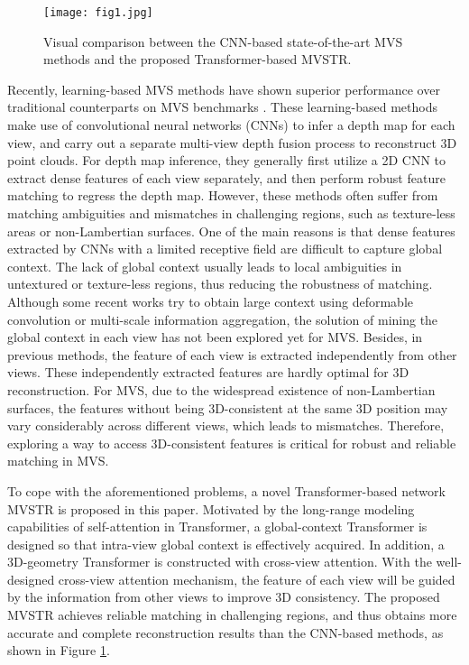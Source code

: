 \documentclass[10pt,twocolumn,letterpaper]{article}
\begin{document}
\begin{figure}[!t]
	\centering
	\texttt{[image: fig1.jpg]}
	\caption{Visual comparison between the CNN-based state-of-the-art MVS methods \cite{rmvsnet,ucsnet,patchmatchnet} and the proposed Transformer-based MVSTR.}
	\label{fig.1}
	\vspace{-0.5cm}
\end{figure}

Recently, learning-based MVS methods \cite{mvsnet,rmvsnet,pmvsnet,mvscrf,pointmvsnet,cider,fastmvsnet,casmvsnet,cvpmvsnet,ucsnet,pvamvsnet,patchmatchnet,aarmvsnet,eppmvsnet} have shown superior performance over traditional counterparts on MVS benchmarks \cite{dtu,t&t}. These learning-based methods make use of convolutional neural networks (CNNs) to infer a depth map for each view, and carry out a separate multi-view depth fusion process to reconstruct 3D point clouds. For depth map inference, they generally first utilize a 2D CNN to extract dense features of each view separately, and then perform robust feature matching to regress the depth map. However, these methods often suffer from matching ambiguities and mismatches in challenging regions, such as texture-less areas or non-Lambertian surfaces. One of the main reasons is that dense features extracted by CNNs with a limited receptive field are difficult to capture global context. The lack of global context usually leads to local ambiguities in untextured or texture-less regions, thus reducing the robustness of matching. Although some recent works \cite{aarmvsnet,mvscrf} try to obtain large context using deformable convolution or multi-scale information aggregation, the solution of mining the global context in each view has not been explored yet for MVS. Besides, in previous methods, the feature of each view is extracted independently from other views. These independently extracted features are hardly optimal for 3D reconstruction. For MVS, due to the widespread existence of non-Lambertian surfaces, the features without being 3D-consistent at the same 3D position may vary considerably across different views, which leads to mismatches. Therefore, exploring a way to access 3D-consistent features is critical for robust and reliable matching in MVS.
 
To cope with the aforementioned problems, a novel Transformer-based network MVSTR is proposed in this paper. Motivated by the long-range modeling capabilities of self-attention in Transformer, a global-context Transformer is designed so that intra-view global context is effectively acquired. In addition, a 3D-geometry Transformer is constructed with cross-view attention. With the well-designed cross-view attention mechanism, the feature of each view will be guided by the information from other views to improve 3D consistency. The proposed MVSTR achieves reliable matching in challenging regions, and thus obtains more accurate and complete reconstruction results than the CNN-based methods, as shown in Figure \ref{fig.1}.
\end{document}
